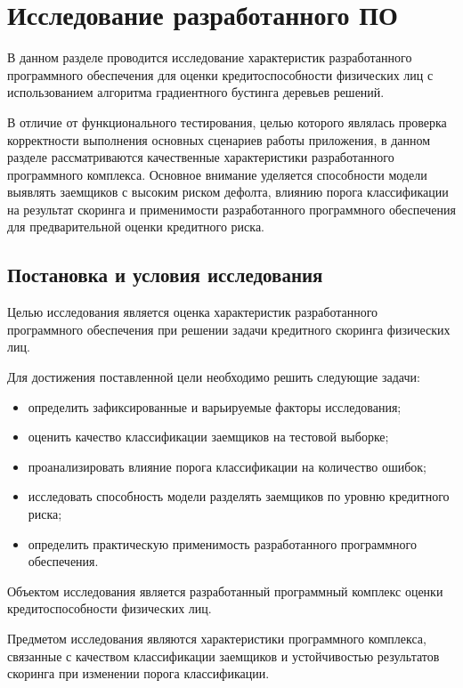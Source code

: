 \section{Исследование разработанного ПО}

В данном разделе проводится исследование характеристик разработанного программного обеспечения для оценки кредитоспособности физических лиц с использованием алгоритма градиентного бустинга деревьев решений.

В отличие от функционального тестирования, целью которого являлась проверка корректности выполнения основных сценариев работы приложения, в данном разделе рассматриваются качественные характеристики разработанного программного комплекса. Основное внимание уделяется способности модели выявлять заемщиков с высоким риском дефолта, влиянию порога классификации на результат скоринга и применимости разработанного программного обеспечения для предварительной оценки кредитного риска.

\subsection{Постановка и условия исследования}

Целью исследования является оценка характеристик разработанного программного обеспечения при решении задачи кредитного скоринга физических лиц.

Для достижения поставленной цели необходимо решить следующие задачи:

\begin{itemize}
    \item определить зафиксированные и варьируемые факторы исследования;
    \item оценить качество классификации заемщиков на тестовой выборке;
    \item проанализировать влияние порога классификации на количество ошибок;
    \item исследовать способность модели разделять заемщиков по уровню кредитного риска;
    \item определить практическую применимость разработанного программного обеспечения.
\end{itemize}

Объектом исследования является разработанный программный комплекс оценки кредитоспособности физических лиц.

Предметом исследования являются характеристики программного комплекса, связанные с качеством классификации заемщиков и устойчивостью результатов скоринга при изменении порога классификации.

